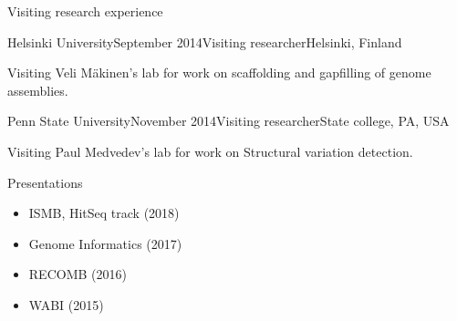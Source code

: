 \documentclass{resume} %
\begin{document}




\begin{rSection}{Visiting research experience}

\begin{rSubsection}{Helsinki University}{September 2014}{Visiting researcher}{Helsinki, Finland}
\item Visiting Veli M{\"a}kinen's lab for work on scaffolding and gapfilling of genome assemblies.
\end{rSubsection}

\begin{rSubsection}{Penn State University}{November 2014}{Visiting researcher}{State college, PA, USA}
\item Visiting Paul Medvedev's lab for work on Structural variation detection.
\end{rSubsection}
\end{rSection}

\begin{rSection}{Presentations}
\begin{itemize}
    \item ISMB, HitSeq track (2018)
    \item Genome Informatics (2017)
    \item RECOMB (2016)
    \item WABI (2015)
\end{itemize}
\end{rSection}

\end{document}
